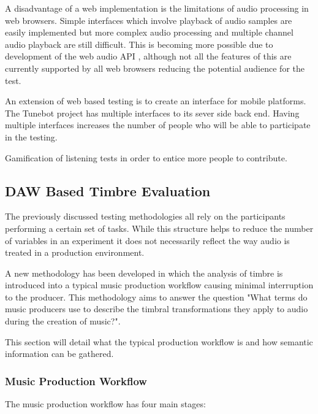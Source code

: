 		A disadvantage of a web implementation is the limitations of audio processing in web browsers. Simple
		interfaces which involve playback of audio samples are easily implemented but more complex audio processing
		and multiple channel audio playback are still difficult. This is becoming more possible due to development
		of the web audio API \citep{adenot2015web}, although not all the features of this are currently supported by
		all web browsers reducing the potential audience for the test.

		An extension of web based testing is to create an interface for mobile platforms. The Tunebot project
		\citep{huq2010crowdsourcing} has multiple interfaces to its sever side back end. Having multiple interfaces
		increases the number of people who will be able to participate in the testing.

		\note
		{
			Gamification of listening tests in order to entice more people to contribute.
		}

	\subsection{DAW Based Timbre Evaluation} %
	\label{sec:ListeningTests-DistributedListeningTests-DAWBasedTimbreEvaluation}
		The previously discussed testing methodologies all rely on the participants performing a certain set of
		tasks. While this structure helps to reduce the number of variables in an experiment it does not necessarily
		reflect the way audio is treated in a production environment.

		A new methodology has been developed in which the analysis of timbre is introduced into a typical music
		production workflow causing minimal interruption to the producer. This methodology aims to answer the
		question "What terms do music producers use to describe the timbral transformations they apply to audio
		during the creation of music?". 
		
		This section will detail what the typical production workflow is and how semantic information can be
		gathered.

		\subsubsection{Music Production Workflow}

			The music production workflow has four main stages:

